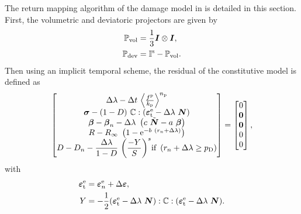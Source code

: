 The return mapping algorithm of the damage model in  is detailed in this section. First, the volumetric and deviatoric projectors are given by
\newcommand{\Is}{\ffI^{\rs}}
\newcommand{\Pvol}{\ffP_{\rm vol}}
\newcommand{\Pdev}{\ffP_{\rm dev}}
\begin{equation}
	\begin{split}
		\Pvol &=\frac{1}{3} \fI \otimes \fI, \\
		\Pdev &=\Is-\Pvol.
	\end{split}
\end{equation}
Then using an implicit temporal scheme, the residual of the constitutive model is defined as
\begin{equation}
	\begin{bmatrix}
		\Delta \lambda - \Delta t \  {\left\langle \frac{f^{\rm p}}{k_{\rm p}} \right\rangle}^{{n_{\rm p}}}                                                              \\
		\mbox{$\bm \sigma$} - (1-D) \  {\mathbb{ C}} : (\mbox{$\bm \varepsilon $}^{\rm{e}}_{\rm t} - \Delta \lambda \  \mbox{$\bm  N$})                                                     \\
		\mbox{$\bm \beta$} - \mbox{$\bm \beta$}_n - \Delta \lambda \  \left( c \  {\tilde{\mbox{$\bm  N$}}} - a \  \mbox{$\bm \beta$} \right)                                          \\
		R - R_\infty \  \left(1-\mathrm{e}^{-b\  (r_n + \Delta \lambda)}\right)                                                            \\
		D - D_n - \displaystyle \frac{{\Delta \lambda}}{1-D} \  {\left( \frac{ -Y }{S} \right)}^{s} \text{if }\left(r_n + \Delta \lambda \geq p_{\rm D}\right) \\
	\end{bmatrix} = \begin{bmatrix}
		0      \\
		\mbox{$\bm  0$} \\
		\mbox{$\bm  0$} \\
		0      \\
		0      \\
	\end{bmatrix},
	\label{eq_residual}
\end{equation}
with
\begin{equation}
	\begin{split}
		\mbox{$\bm \varepsilon $}^{\rm{e}}_{\rm t} &= \mbox{$\bm \varepsilon $}^{\rm{e}}_n + \Delta \mbox{$\bm \varepsilon $},\\
		Y &= -\frac{1}{2} (\mbox{$\bm \varepsilon $}^{\rm{e}}_{\rm t} - \Delta \lambda \  \mbox{$\bm  N$}) :  {\mathbb{ C}} :  (\mbox{$\bm \varepsilon $}^{\rm{e}}_{\rm t} - \Delta \lambda \  \mbox{$\bm  N$}).
	\end{split}
\end{equation}
